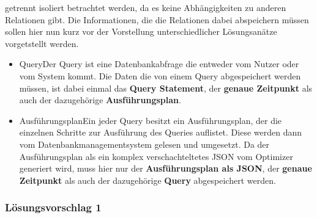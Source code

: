getrennt isoliert betrachtet werden, da es keine Abhängigkeiten zu anderen Relationen gibt. Die Informationen, die die Relationen dabei abspeichern müssen sollen hier nun kurz vor der Vorstellung unterschiedlicher Lösungsanätze vorgetstellt werden.
\begin{itemize}
	\item Query\newline Der Query ist eine Datenbankabfrage die entweder vom Nutzer oder vom System kommt. Die Daten die von einem Query abgespeichert werden müssen, ist dabei einmal das \textbf{Query Statement}, der \textbf{genaue Zeitpunkt} als auch der dazugehörige \textbf{Ausführungsplan}.
	\item Ausführungsplan\newline Ein jeder Query besitzt ein Ausführungsplan, der die einzelnen Schritte zur Ausführung des Queries auflistet. Diese werden dann vom Datenbankmanagementsystem gelesen und umgesetzt. Da der Ausführungsplan als ein komplex verschachteltetes JSON vom Optimizer generiert wird, muss hier nur der \textbf{Ausführungsplan als JSON}, der \textbf{genaue Zeitpunkt} als auch der dazugehörige \textbf{Query} abgespeichert werden.
\end{itemize}




\subsubsection{Lösungsvorschlag 1}


